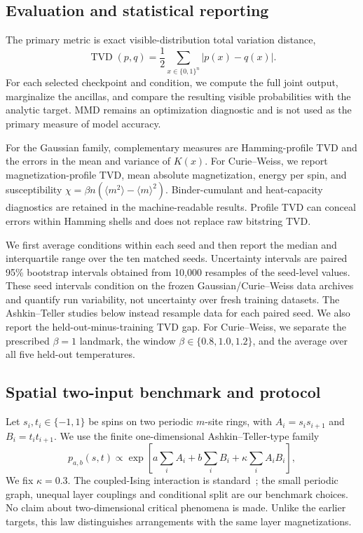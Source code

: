 \documentclass[pra,aps,10pt,twocolumn,floatfix,superscriptaddress,
notitlepage,longbibliography]{revtex4-2}
\newcommand{\TVD}{\operatorname{TVD}}
\begin{document}
\subsection{Evaluation and statistical reporting}

The primary metric is exact visible-distribution total variation distance,
\begin{equation}
    \TVD(p,q)=\frac{1}{2}\sum_{x\in\{0,1\}^n}|p(x)-q(x)|.
    \label{eq:exact-tvd}
\end{equation}
For each selected checkpoint and condition, we compute the full joint output, marginalize the ancillas, and compare the resulting visible probabilities with the analytic target. MMD remains an optimization diagnostic and is not used as the primary measure of model accuracy.

For the Gaussian family, complementary measures are Hamming-profile TVD and the errors in the mean and variance of $K(x)$. For Curie--Weiss, we report magnetization-profile TVD, mean absolute magnetization, energy per spin, and susceptibility $\chi=\beta n(\langle m^2\rangle-\langle m\rangle^2)$. Binder-cumulant and heat-capacity diagnostics are retained in the machine-readable results. Profile TVD can conceal errors within Hamming shells and does not replace raw bitstring TVD.

We first average conditions within each seed and then report the median and interquartile range over the ten matched seeds. Uncertainty intervals are paired 95\% bootstrap intervals obtained from 10,000 resamples of the seed-level values. These seed intervals condition on the frozen Gaussian/Curie--Weiss data archives and quantify run variability, not uncertainty over fresh training datasets. The Ashkin--Teller studies below instead resample data for each paired seed. We also report the held-out-minus-training TVD gap. For Curie--Weiss, we separate the prescribed $\beta=1$ landmark, the window $\beta\in\{0.8,1.0,1.2\}$, and the average over all five held-out temperatures.

\subsection{Spatial two-input benchmark and protocol}
\label{sec:at-protocol}

Let $s_i,t_i\in\{-1,1\}$ be spins on two periodic $m$-site rings, with $A_i=s_i s_{i+1}$ and $B_i=t_i t_{i+1}$. We use the finite one-dimensional Ashkin--Teller-type family
\begin{equation}
 p_{a,b}(s,t)\propto\exp\!\left[a\sum_i A_i+b\sum_i B_i+\kappa\sum_i A_iB_i\right],
 \label{eq:at-target}
\end{equation}
We fix $\kappa=0.3$. The coupled-Ising interaction is standard~\cite{aounPhaseDiagramAshkinTeller2023}; the small periodic graph, unequal layer couplings and conditional split are our benchmark choices. No claim about two-dimensional critical phenomena is made. Unlike the earlier targets, this law distinguishes arrangements with the same layer magnetizations.
\end{document}
